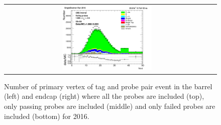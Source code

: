 \begin{figure}[htp]
\begin{center}
\begin{tabular}{cc}
      \includegraphics[width=0.45\textwidth]{figures/Zprime/2016/ScaleFactor/SameSign/nominal/stack_nVtx_Endcap_fail_PUW.png}
    \end{tabular}
    \caption{Number of primary vertex of tag and probe pair event in the barrel (left) and endcap (right) where all the probes are included (top), only passing probes are included (middle) and only failed probes are included (bottom) for 2016.}
    \label{fig:SS_nominal_PV_2016}
  \end{center}
\end{figure}



